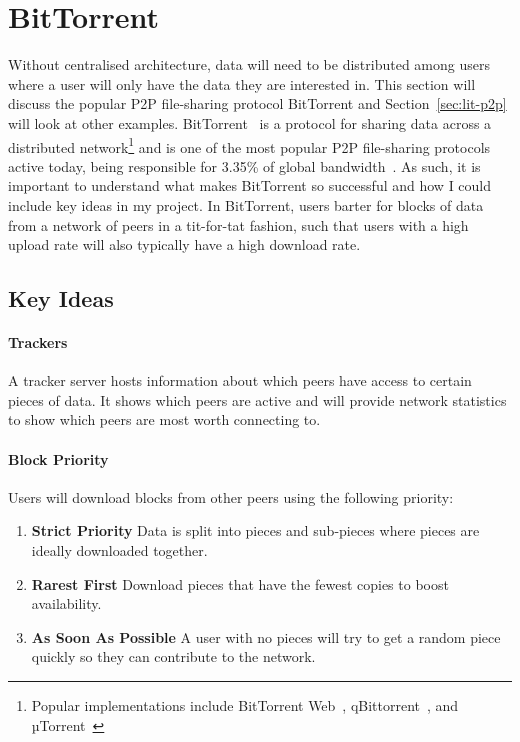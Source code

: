 
\section{BitTorrent}\label{sec:bittorrent}

Without centralised architecture, data will need to be distributed among users where a user will only have the data they are interested in. This section will discuss the popular P2P file-sharing protocol BitTorrent and Section~\ref{sec:lit-p2p} will look at other examples.
\x
BitTorrent~\cite{kaune_unraveling_2010, pouwelse_bittorrent_2005} is a protocol for sharing data across a distributed network\footnote{Popular implementations include BitTorrent Web~\cite{inc_bittorrent_nodate}, qBittorrent~\cite{noauthor_qbittorrent_nodate}, and µTorrent~\cite{inc_torrent_nodate}} and is one of the most popular P2P file-sharing protocols active today, being responsible for 3.35\% of global bandwidth~\cite{noauthor_application_nodate}. 
As such, it is important to understand what makes BitTorrent so successful and how I could include key ideas in my project.
In BitTorrent, users barter for blocks of data from a network of peers in a tit-for-tat fashion, such that users with a high upload rate will also typically have a high download rate.

\subsection*{Key Ideas}

\paragraph*{Trackers}
A tracker server hosts information about which peers have access to certain pieces of data. It shows which peers are active and will provide network statistics to show which peers are most worth connecting to.

\paragraph*{Block Priority}
Users will download blocks from other peers using the following priority:
\begin{enumerate}
  \item \textbf{Strict Priority} Data is split into pieces and sub-pieces where pieces are ideally downloaded together.
  \item \textbf{Rarest First} Download pieces that have the fewest copies to boost availability.
  \item \textbf{As Soon As Possible} A user with no pieces will try to get a random piece quickly so they can contribute to the network. 
\end{enumerate}

